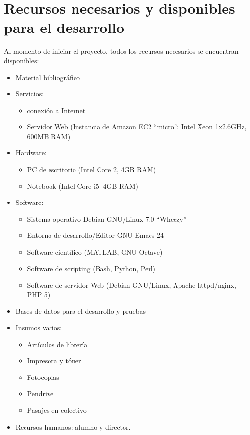 \documentclass[bibliography=openstyle,DIV=12]{scrartcl}
\begin{document}
\section{Recursos necesarios y disponibles para el desarrollo}
Al momento de iniciar el proyecto, todos los recursos necesarios se encuentran disponibles:
\begin{itemize}
\item Material bibliográfico
\item Servicios:
  \begin{itemize}
  \item conexión a Internet
  \item Servidor Web (Instancia de Amazon EC2 ``micro'': Intel Xeon 1x2.6GHz, 600MB RAM)
  \end{itemize}
\item Hardware:
  \begin{itemize}
  \item PC de escritorio (Intel Core 2, 4GB RAM)
  \item Notebook (Intel Core i5, 4GB RAM)
  \end{itemize}
\item Software:
  \begin{itemize}
  \item Sistema operativo Debian GNU/Linux 7.0 ``Wheezy''
  \item Entorno de desarrollo/Editor GNU Emacs 24
  \item Software científico (MATLAB, GNU Octave)
  \item Software de scripting (Bash, Python, Perl)
  \item Software de servidor Web (Debian GNU/Linux, Apache httpd/nginx, PHP 5)
  \end{itemize}
\item Bases de datos para el desarrollo y pruebas
\item Insumos varios:
  \begin{itemize}
  \item Artículos de librería
  \item Impresora y tóner
  \item Fotocopias
  \item Pendrive
  \item Pasajes en colectivo
  \end{itemize}
\item Recursos humanos: alumno y director.
\end{itemize}

\newcommand{\mcol}[3]{\multicolumn{#1}{#2}{#3}}
\newcommand{\mrow}[3]{\multirow{#1}{#2}{#3}}
\end{document}
